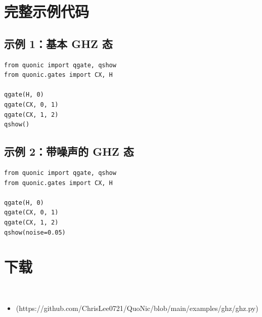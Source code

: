 \documentclass[12pt,a4paper]{article}
\begin{document}
\section{完整示例代码}

\subsection{示例 1：基本 GHZ 态}

\begin{lstlisting}[style=python]
from quonic import qgate, qshow
from quonic.gates import CX, H

qgate(H, 0)
qgate(CX, 0, 1)
qgate(CX, 1, 2)
qshow()
\end{lstlisting}

\subsection{示例 2：带噪声的 GHZ 态}

\begin{lstlisting}[style=python]
from quonic import qgate, qshow
from quonic.gates import CX, H

qgate(H, 0)
qgate(CX, 0, 1)
qgate(CX, 1, 2)
qshow(noise=0.05)
\end{lstlisting}


\section{下载}

\begin{itemize}
  \item [ghz.py](https://github.com/ChrisLee0721/QuoNic/blob/main/examples/ghz/ghz.py)
\end{itemize}
\end{document}

